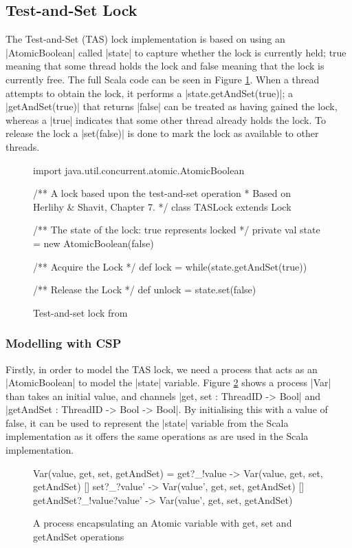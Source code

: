 \subsection{Test-and-Set Lock}

The Test-and-Set (TAS) lock implementation is based on using an |AtomicBoolean| called |state| to capture whether the lock is currently held; true meaning that some thread holds the lock and false meaning that the lock is currently free. The full Scala code can be seen in Figure \ref{fig:TASScala}. When a thread attempts to obtain the lock, it performs a |state.getAndSet(true)|; a |getAndSet(true)| that returns |false| can be treated as having gained the lock, whereas a |true| indicates that some other thread already holds the lock. To release the lock a |set(false)| is done to mark the lock as available to other threads.

\begin{figure}
  \begin{scala}
  import java.util.concurrent.atomic.AtomicBoolean

  /** A lock based upon the test-and-set operation 
    * Based on Herlihy & Shavit, Chapter 7. */
  class TASLock extends Lock{
    /** The state of the lock: true represents locked */
    private val state = new AtomicBoolean(false)

    /** Acquire the Lock */ 
    def lock = while(state.getAndSet(true)){ }

    /** Release the Lock */
    def unlock = state.set(false)
  }
  \end{scala}
  \caption{Test-and-set lock from \cite{CADS-4}  \label{fig:TASScala}}
\end{figure}

\subsubsection{Modelling with CSP}


\inlineCSP

Firstly, in order to model the TAS lock, we need a process that acts as an |AtomicBoolean| to model the |state| variable. Figure \ref{csp:Variable} shows a process |Var| than takes an initial value, and channels |get, set : ThreadID -> Bool| and |getAndSet : ThreadID -> Bool -> Bool|. By initialising this with a value of false, it can be used to represent the |state| variable from the Scala implementation as it offers the same operations as are used in the Scala implementation.

\begin{figure}
  \begin{cspm}
  Var(value, get, set, getAndSet) = 
    get?_!value -> Var(value, get, set, getAndSet)
    [] set?_?value' -> Var(value', get, set, getAndSet)
    [] getAndSet?_!value?value' -> Var(value', get, set, getAndSet)
  \end{cspm}
  \caption{A process encapsulating an Atomic variable with get, set and getAndSet operations}
  \label{csp:Variable}
\end{figure}


